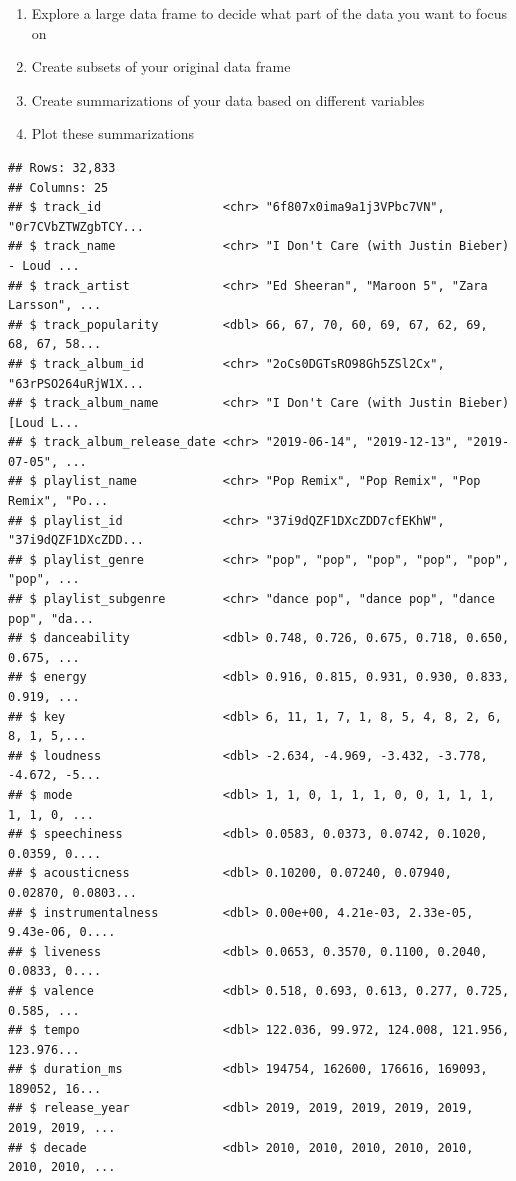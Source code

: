 \documentclass[
]{book}
\begin{document}
\begin{enumerate}
\def\labelenumi{\arabic{enumi})}
\item
  Explore a large data frame to decide what part of the data you want to focus on
\item
  Create subsets of your original data frame
\item
  Create summarizations of your data based on different variables
\item
  Plot these summarizations
\end{enumerate}

\begin{verbatim}
## Rows: 32,833
## Columns: 25
## $ track_id                 <chr> "6f807x0ima9a1j3VPbc7VN", "0r7CVbZTWZgbTCY...
## $ track_name               <chr> "I Don't Care (with Justin Bieber) - Loud ...
## $ track_artist             <chr> "Ed Sheeran", "Maroon 5", "Zara Larsson", ...
## $ track_popularity         <dbl> 66, 67, 70, 60, 69, 67, 62, 69, 68, 67, 58...
## $ track_album_id           <chr> "2oCs0DGTsRO98Gh5ZSl2Cx", "63rPSO264uRjW1X...
## $ track_album_name         <chr> "I Don't Care (with Justin Bieber) [Loud L...
## $ track_album_release_date <chr> "2019-06-14", "2019-12-13", "2019-07-05", ...
## $ playlist_name            <chr> "Pop Remix", "Pop Remix", "Pop Remix", "Po...
## $ playlist_id              <chr> "37i9dQZF1DXcZDD7cfEKhW", "37i9dQZF1DXcZDD...
## $ playlist_genre           <chr> "pop", "pop", "pop", "pop", "pop", "pop", ...
## $ playlist_subgenre        <chr> "dance pop", "dance pop", "dance pop", "da...
## $ danceability             <dbl> 0.748, 0.726, 0.675, 0.718, 0.650, 0.675, ...
## $ energy                   <dbl> 0.916, 0.815, 0.931, 0.930, 0.833, 0.919, ...
## $ key                      <dbl> 6, 11, 1, 7, 1, 8, 5, 4, 8, 2, 6, 8, 1, 5,...
## $ loudness                 <dbl> -2.634, -4.969, -3.432, -3.778, -4.672, -5...
## $ mode                     <dbl> 1, 1, 0, 1, 1, 1, 0, 0, 1, 1, 1, 1, 1, 0, ...
## $ speechiness              <dbl> 0.0583, 0.0373, 0.0742, 0.1020, 0.0359, 0....
## $ acousticness             <dbl> 0.10200, 0.07240, 0.07940, 0.02870, 0.0803...
## $ instrumentalness         <dbl> 0.00e+00, 4.21e-03, 2.33e-05, 9.43e-06, 0....
## $ liveness                 <dbl> 0.0653, 0.3570, 0.1100, 0.2040, 0.0833, 0....
## $ valence                  <dbl> 0.518, 0.693, 0.613, 0.277, 0.725, 0.585, ...
## $ tempo                    <dbl> 122.036, 99.972, 124.008, 121.956, 123.976...
## $ duration_ms              <dbl> 194754, 162600, 176616, 169093, 189052, 16...
## $ release_year             <dbl> 2019, 2019, 2019, 2019, 2019, 2019, 2019, ...
## $ decade                   <dbl> 2010, 2010, 2010, 2010, 2010, 2010, 2010, ...
\end{verbatim}
\end{document}
